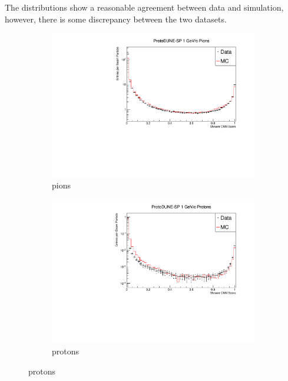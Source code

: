 The distributions show a reasonable agreement between data and simulation, 
however, there is some discrepancy between the two datasets. 

\begin{figure}

	\centering

	\begin{subfigure}[b]{0.7\textwidth}
		\centering
		\includegraphics[width=\textwidth]{figures/hit_cnn_pion.pdf}
		\caption {pions}
		\label{fig:beam_pi_cnn}
	\end{subfigure}

	\begin{subfigure}[b]{0.7\textwidth}
		\centering
		\includegraphics[width=\textwidth]{figures/hit_cnn_proton.pdf}
		\caption {protons}
		\label{fig:beam_proton_cnn}
	\end{subfigure}


\end{figure}
